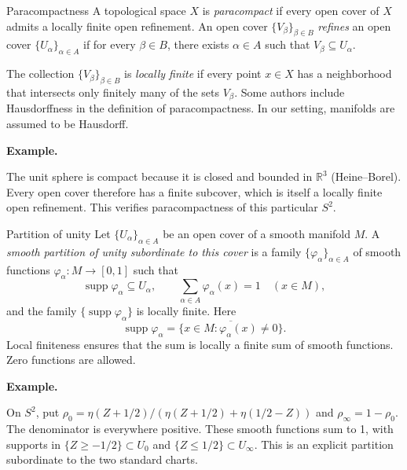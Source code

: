 \documentclass[11pt]{article}
\makeatletter
\newcommand{\R}{\mathbb R}
\newcommand{\supp}{\operatorname{supp}}
\newcounter{definition}
\newcommand{\exampleheading}{\par\medskip\textbf{Example.}\par\smallskip}
\newcommand{\currentdefinition}[1]{\protected@edef\@currentlabel{#1}}
\makeatother
\begin{document}
\begin{definitionbox}{Paracompactness}
\currentdefinition{\thedefinition}
\label{source:S04}
\label{def:12-03}
A topological space $X$ is \emph{paracompact} if every open cover of $X$ admits a locally finite open refinement.
An open cover $\{V_\beta\}_{\beta\in B}$ \emph{refines} an open cover
$\{U_\alpha\}_{\alpha\in A}$ if for every $\beta\in B$, there exists
$\alpha\in A$ such that $V_\beta \subseteq U_\alpha.$

The collection $\{V_\beta\}_{\beta\in B}$ is \emph{locally finite} if every point $x\in X$ has a neighborhood that intersects only finitely many of the sets $V_\beta$.
Some authors include Hausdorffness in the definition of paracompactness. In our setting, manifolds are assumed to be Hausdorff.


\exampleheading
The unit sphere is compact because it is closed and bounded in $\R^3$ (Heine--Borel). Every open cover therefore has a finite subcover, which is itself a locally finite open refinement. This verifies paracompactness of this particular $S^2$.
\end{definitionbox}


\begin{definitionbox}{Partition of unity}
\currentdefinition{\thedefinition}
\label{source:S05}
\label{def:12-05}
Let $\{U_\alpha\}_{\alpha\in A}$ be an open cover of a smooth manifold $M$.
A \emph{smooth partition of unity subordinate to this cover} is a family
$\{\varphi_\alpha\}_{\alpha\in A}$ of smooth functions
$\varphi_\alpha:M\to[0,1]$ such that
\[
\supp\varphi_\alpha\subseteq U_\alpha,
\qquad
\sum_{\alpha\in A}\varphi_\alpha(x)=1\quad(x\in M),
\]
and the family $\{\supp\varphi_\alpha\}$ is locally finite. Here
\[
\supp\varphi_\alpha
=\overline{\{x\in M:\varphi_\alpha(x)\ne0\}}.
\]
Local finiteness ensures that the sum is locally a finite sum of smooth
functions. Zero functions are allowed.


\exampleheading
On $S^2$, put $\rho_0=\eta(Z+1/2)/(\eta(Z+1/2)+\eta(1/2-Z))$ and $\rho_\infty=1-\rho_0$. The denominator is everywhere positive. These smooth functions sum to 1, with supports in $\{Z\ge-1/2\}\subset U_0$ and $\{Z\le1/2\}\subset U_\infty$. This is an explicit partition subordinate to the two standard charts.
\end{definitionbox}
\end{document}
